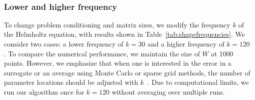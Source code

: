 \begin{table}
    \\\vspace{20pt}
    \caption{Results of running Algorithms~\ref{alg:location-allocation} and~\ref{alg:gray-box-gpr} with the shape problem introduced in Section~\ref{subsec:parameterized-domain} with a wavenumber $k=60$. Times in seconds and averaged over five runs.}
    \label{tab:alltestdata}
\end{table}

\subsubsection{Lower and higher frequency}
To change problem conditioning and matrix sizes, we modify the frequency $k$ of the Helmholtz equation, with results shown in Table~\ref{tab:shapefrequencies}.
We consider two cases: a lower frequency of $k=30$ and a higher frequency of $k=120$.
To compare the numerical performance, we maintain the size of $W$ at 1000 points.
However, we emphasize that when one is interested in the error in a surrogate or an average using Monte Carlo or sparse grid methods, the number of parameter locations should be adjusted with $k$~\cite{hiptmair2024}.
Due to computational limits, we run our algorithm once for $k=120$ without averaging over multiple runs.

